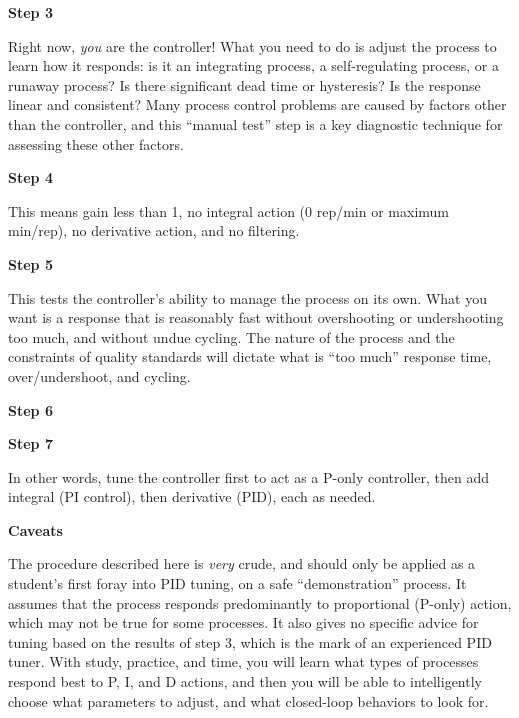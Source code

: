 \documentclass[12pt,a4paper]{article}
\begin{document}
\vskip 10pt

\noindent
{\bf Step 3}

  Right now, {\it you} are the controller!  What you need to do is adjust the process to learn how it responds: is it an integrating process, a self-regulating process, or a runaway process?  Is there significant dead time or hysteresis?  Is the response linear and consistent?  Many process control problems are caused by factors other than the controller, and this ``manual test'' step is a key diagnostic technique for assessing these other factors.

\vskip 10pt

\noindent
{\bf Step 4}

  This means gain less than 1, no integral action (0 rep/min or maximum min/rep), no derivative action, and no filtering.

\vskip 10pt

\noindent
{\bf Step 5}

  This tests the controller's ability to manage the process on its own.  What you want is a response that is reasonably fast without overshooting or undershooting too much, and without undue cycling.  The nature of the process and the constraints of quality standards will dictate what is ``too much'' response time, over/undershoot, and cycling.

\vskip 10pt

\noindent
{\bf Step 6}


\vskip 10pt

\noindent
{\bf Step 7}

  In other words, tune the controller first to act as a P-only controller, then add integral (PI control), then derivative (PID), each as needed.

\filbreak

\centerline{\bf Caveats}

\vskip 10pt

The procedure described here is {\it very} crude, and should only be applied as a student's first foray into PID tuning, on a safe ``demonstration'' process.  It assumes that the process responds predominantly to proportional (P-only) action, which may not be true for some processes.  It also gives no specific advice for tuning based on the results of step 3, which is the mark of an experienced PID tuner.  With study, practice, and time, you will learn what types of processes respond best to P, I, and D actions, and then you will be able to intelligently choose what parameters to adjust, and what closed-loop behaviors to look for.
\end{document}
